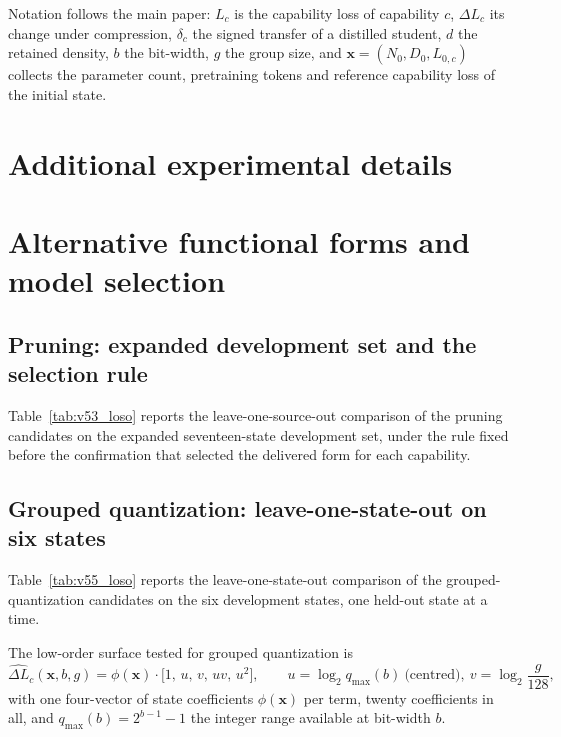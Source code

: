 Notation follows the main paper: $L_c$ is the capability loss of capability $c$,
$\Delta L_c$ its change under compression, $\delta_c$ the signed transfer of a distilled student,
$d$ the retained density, $b$ the bit-width, $g$ the group size, and $\mathbf x=(N_0,D_0,L_{0,c})$
collects the parameter count, pretraining tokens and reference capability loss of the initial state.

\section{Additional experimental details}
\label{sec:supp_details}




\FloatBarrier

\section{Alternative functional forms and model selection}
\label{sec:supp_forms}

\subsection{Pruning: expanded development set and the selection rule}
Table~\ref{tab:v53_loso} reports the leave-one-source-out comparison of the pruning candidates on the
expanded seventeen-state development set, under the rule fixed before the confirmation that selected the delivered
form for each capability.

\subsection{Grouped quantization: leave-one-state-out on six states}
Table~\ref{tab:v55_loso} reports the leave-one-state-out comparison of the grouped-quantization
candidates on the six development states, one held-out state at a time.
\begin{retargetreferences}{}

\end{retargetreferences}

The low-order surface tested for grouped quantization is
\begin{equation}
\widehat{\Delta L}_c(\mathbf x,b,g)=\phi(\mathbf x)\cdot\big[1,\,u,\,v,\,uv,\,u^2\big],
\qquad u=\log_2 q_{\max}(b)\ \text{(centred)},\ v=\log_2\frac{g}{128},
\label{eq:quant2d}
\end{equation}
with one four-vector of state coefficients $\phi(\mathbf x)$ per term, twenty coefficients in all, and
$q_{\max}(b)=2^{b-1}-1$ the integer range available at bit-width $b$.

